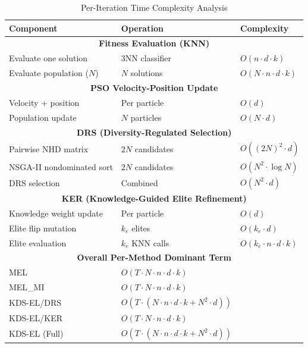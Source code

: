 \begin{table}[htbp]
\centering
\caption{Per-Iteration Time Complexity Analysis}
\label{tab:complexity}
\small
\begin{tabular}{lll}
\toprule
Component & Operation & Complexity \\
\midrule
\multicolumn{3}{c}{\textbf{Fitness Evaluation (KNN)}} \\
\quad Evaluate one solution        & 3NN classifier           & $O(n \cdot d \cdot k)$ \\
\quad Evaluate population ($N$)    & $N$ solutions            & $O(N \cdot n \cdot d \cdot k)$ \\
\midrule
\multicolumn{3}{c}{\textbf{PSO Velocity-Position Update}} \\
\quad Velocity + position          & Per particle             & $O(d)$ \\
\quad Population update            & $N$ particles            & $O(N \cdot d)$ \\
\midrule
\multicolumn{3}{c}{\textbf{DRS (Diversity-Regulated Selection)}} \\
\quad Pairwise NHD matrix          & $2N$ candidates          & $O((2N)^2 \cdot d)$ \\
\quad NSGA-II nondominated sort    & $2N$ candidates          & $O(N^2 \cdot \log N)$ \\
\quad DRS selection                & Combined                 & $O(N^2 \cdot d)$ \\
\midrule
\multicolumn{3}{c}{\textbf{KER (Knowledge-Guided Elite Refinement)}} \\
\quad Knowledge weight update      & Per particle             & $O(d)$ \\
\quad Elite flip mutation          & $k_e$ elites             & $O(k_e \cdot d)$ \\
\quad Elite evaluation             & $k_e$ KNN calls          & $O(k_e \cdot n \cdot d \cdot k)$ \\
\midrule
\multicolumn{3}{c}{\textbf{Overall Per-Method Dominant Term}} \\
MEL                     & $O(T \cdot N \cdot n \cdot d \cdot k)$ \\
MEL\_MI                 & $O(T \cdot N \cdot n \cdot d \cdot k)$ \\
KDS-EL/DRS              & $O(T \cdot (N \cdot n \cdot d \cdot k + N^2 \cdot d))$ \\
KDS-EL/KER              & $O(T \cdot N \cdot n \cdot d \cdot k)$ \\
KDS-EL (Full)           & $O(T \cdot (N \cdot n \cdot d \cdot k + N^2 \cdot d))$ \\

\end{tabular}
\end{table}
